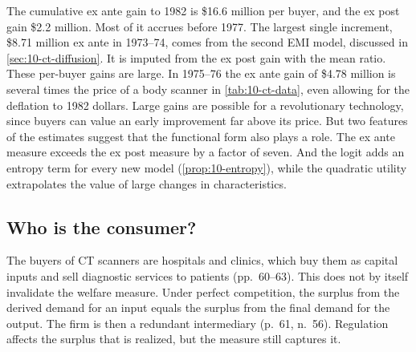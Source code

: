  The cumulative ex ante gain to 1982 is \$16.6 million per buyer, and the ex post gain
\$2.2 million. Most of it accrues before 1977. The largest single increment, \$8.71 million ex ante in 1973--74, comes
from the second EMI model, discussed in \cref{sec:10-ct-diffusion}. It is imputed from the ex post gain with the mean
ratio. These per-buyer gains are large. In 1975--76 the
ex ante gain of \$4.78 million is several times the price of a body scanner in \cref{tab:10-ct-data}, even allowing
for the deflation to 1982 dollars. Large gains are possible for a revolutionary technology, since buyers can value an
early improvement far above its price. But two features of the estimates suggest that the functional form also plays
a role. The ex ante measure exceeds the ex post measure by a factor of seven. And the logit adds an entropy term for
every new model (\cref{prop:10-entropy}), while the quadratic utility extrapolates the value of large changes in
characteristics.

\subsection{Who is the consumer?}\label{sec:10-ct-consumer}

The buyers of CT scanners are hospitals and clinics, which buy them as capital inputs and sell diagnostic services to
patients (pp.~60--63). This does not by itself invalidate the welfare measure. Under perfect competition, the surplus
from the derived demand for an input equals the surplus from the final demand for the output. The firm is then a
redundant intermediary (p.~61, n.~56). Regulation affects the surplus that is realized, but the measure still captures
it.

